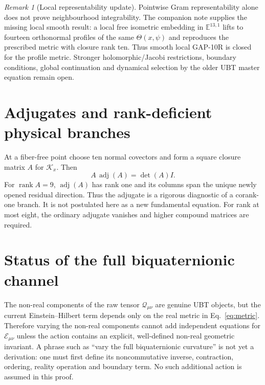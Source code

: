 \documentclass[11pt,a4paper]{article}
\theoremstyle{remark}
\newtheorem{remark}[definition]{Remark}
\newcommand{\E}{\mathscr E}
\begin{document}
\begin{remark}[Local representability update]
Pointwise Gram representability alone does not prove neighbourhood
integrability.  The companion note
 supplies the
missing local smooth result: a local free isometric embedding in
$\mathbb E^{13,1}$ lifts to fourteen orthonormal profiles of the same
$\Theta(x,\psi)$ and reproduces the prescribed metric with closure rank ten.
Thus smooth local GAP-10R is closed for the profile metric.  Stronger
holomorphic/Jacobi restrictions, boundary conditions, global continuation and
dynamical selection by the older UBT master equation remain open.
\end{remark}

\section{Adjugates and rank-deficient physical branches}

At a fiber-free point choose ten normal covectors and form a square closure
matrix $A$ for $\mathcal K_x$.  Then
\begin{equation}
  A\,\operatorname{adj}(A)=\det(A)I.
\end{equation}
For $\operatorname{rank}A=9$, $\operatorname{adj}(A)$ has rank one and its
columns span the unique newly opened residual direction.  Thus the adjugate is
a rigorous diagnostic of a corank-one branch.  It is not postulated here as a
new fundamental equation.  For rank at most eight, the ordinary adjugate
vanishes and higher compound matrices are required.

\section{Status of the full biquaternionic channel}

The non-real components of the raw tensor $\mathcal Q_{\mu\nu}$ are genuine UBT
objects, but the current Einstein--Hilbert term depends only on the real metric
in Eq.~\eqref{eq:metric}.  Therefore varying the non-real components cannot add
independent equations for $\E_{\mu\nu}$ unless the action contains an explicit,
well-defined non-real geometric invariant.  A phrase such as ``vary the full
biquaternionic curvature'' is not yet a derivation: one must first define its
noncommutative inverse, contraction, ordering, reality operation and boundary
term.  No such additional action is assumed in this proof.
\end{document}

